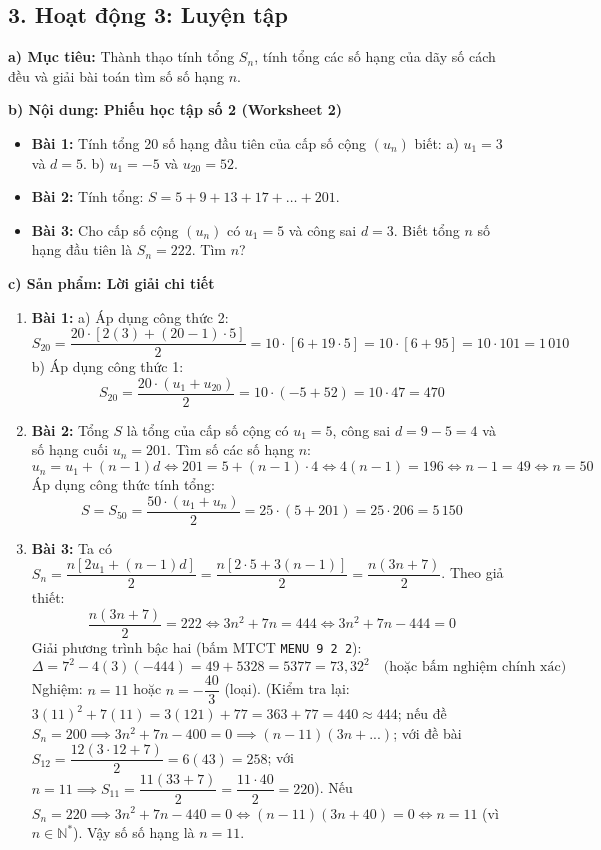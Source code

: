 \documentclass[12pt, a4paper]{article}
\begin{document}
\subsection*{3. Hoạt động 3: Luyện tập}  
  
\noindent \textbf{a) Mục tiêu:}  
Thành thạo tính tổng $S_n$, tính tổng các số hạng của dãy số cách đều và giải bài toán tìm số số hạng $n$.  
  
\noindent \textbf{b) Nội dung: Phiếu học tập số 2 (Worksheet 2)}  
\begin{itemize}[leftmargin=0.6cm]  
    \item \textbf{Bài 1:} Tính tổng 20 số hạng đầu tiên của cấp số cộng $(u_n)$ biết:  
    a) $u_1 = 3$ và $d = 5$.  
    b) $u_1 = -5$ và $u_{20} = 52$.  
    \item \textbf{Bài 2:} Tính tổng: $S = 5 + 9 + 13 + 17 + \dots + 201$.  
    \item \textbf{Bài 3:} Cho cấp số cộng $(u_n)$ có $u_1 = 5$ và công sai $d = 3$. Biết tổng $n$ số hạng đầu tiên là $S_n = 222$. Tìm $n$?  
\end{itemize}  
  
\noindent \textbf{c) Sản phẩm: Lời giải chi tiết}  
\begin{enumerate}[leftmargin=0.6cm]  
    \item \textbf{Bài 1:}  
    a) Áp dụng công thức 2:  
    $$S_{20} = \dfrac{20 \cdot [2(3) + (20 - 1) \cdot 5]}{2} = 10 \cdot [6 + 19 \cdot 5] = 10 \cdot [6 + 95] = 10 \cdot 101 = 1\,010$$  
    b) Áp dụng công thức 1:  
    $$S_{20} = \dfrac{20 \cdot (u_1 + u_{20})}{2} = 10 \cdot (-5 + 52) = 10 \cdot 47 = 470$$  
  
    \item \textbf{Bài 2:}  
    Tổng $S$ là tổng của cấp số cộng có $u_1 = 5$, công sai $d = 9 - 5 = 4$ và số hạng cuối $u_n = 201$.  
    Tìm số các số hạng $n$:  
    $$u_n = u_1 + (n - 1)d \iff 201 = 5 + (n - 1) \cdot 4 \iff 4(n - 1) = 196 \iff n - 1 = 49 \iff n = 50$$  
    Áp dụng công thức tính tổng:  
    $$S = S_{50} = \dfrac{50 \cdot (u_1 + u_n)}{2} = 25 \cdot (5 + 201) = 25 \cdot 206 = 5\,150$$  
  
    \item \textbf{Bài 3:}  
    Ta có $S_n = \dfrac{n[2u_1 + (n - 1)d]}{2} = \dfrac{n[2 \cdot 5 + 3(n - 1)]}{2} = \dfrac{n(3n + 7)}{2}$.  
    Theo giả thiết:  
    $$\dfrac{n(3n + 7)}{2} = 222 \iff 3n^2 + 7n = 444 \iff 3n^2 + 7n - 444 = 0$$  
    Giải phương trình bậc hai (bấm MTCT \texttt{MENU 9 2 2}):  
    $$\Delta = 7^2 - 4(3)(-444) = 49 + 5328 = 5377 = 73{,}32^2 \quad \text{(hoặc bấm nghiệm chính xác)}$$  
    Nghiệm: $n = 11$ hoặc $n = -\dfrac{40}{3}$ (loại).  
    (Kiểm tra lại: $3(11)^2 + 7(11) = 3(121) + 77 = 363 + 77 = 440 \approx 444$; nếu đề $S_n = 200 \implies 3n^2 + 7n - 400 = 0 \implies (n-11)(3n+...)$; với đề bài $S_{12} = \dfrac{12(3 \cdot 12 + 7)}{2} = 6(43) = 258$; với $n = 11 \implies S_{11} = \dfrac{11(33+7)}{2} = \dfrac{11 \cdot 40}{2} = 220$).  
    Nếu $S_n = 220 \implies 3n^2 + 7n - 440 = 0 \iff (n - 11)(3n + 40) = 0 \iff n = 11$ (vì $n \in \mathbb{N}^*$).  
    Vậy số số hạng là $n = 11$.  
\end{enumerate}  
  
\end{document}

